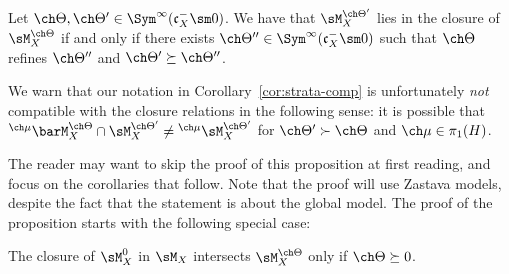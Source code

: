 \begin{prop}
\notready \label{prop:closure-rel}
Let $\ch\Theta,\ch\Theta' \in \Sym^\infty(\mathfrak c_X^- \sm 0)$.
We have that $\sM^{\ch\Theta'}_X$ lies in the closure of $\sM^{\ch\Theta}_X$
if and only if there exists $\ch\Theta'' \in \Sym^\infty(\mathfrak c_X^-\sm 0)$ such that $\ch\Theta$ refines $\ch\Theta''$ and $\ch\Theta' \succeq \ch\Theta''$.
\end{prop}

\begin{rem}
\notready
We warn that our notation in Corollary~\ref{cor:strata-comp} is unfortunately
\emph{not} compatible
with the closure relations in the following sense:
it is possible that $^{\ch\mu} \barM^{\ch\Theta}_X \cap \sM^{\ch\Theta'}_X
\ne {^{\ch\mu}\sM^{\ch\Theta'}_X}$ for $\ch\Theta' \succ \ch\Theta$
and $\ch\mu \in \pi_1(H)$.
\end{rem}



The reader may want to skip the proof of this proposition at first reading, and focus on the corollaries that follow. Note that the proof will use Zastava models, despite the fact that the statement is about the global model. The proof of the proposition starts with the following special case:


\begin{lem}
\notready \label{lem:M0closure}
The closure of $\sM_X^0$ in $\sM_X$ intersects
$\sM_X^{\ch\Theta}$ only if $\ch\Theta \succeq 0$.
\end{lem}

